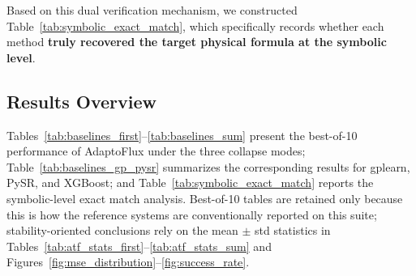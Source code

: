 Based on this dual verification mechanism, we constructed Table~\ref{tab:symbolic_exact_match}, which specifically records whether each method \textbf{truly recovered the target physical formula at the symbolic level}.

\subsection{Results Overview}

Tables~\ref{tab:baselines_first}--\ref{tab:baselines_sum} present the best-of-10 performance of AdaptoFlux under the three collapse modes; Table~\ref{tab:baselines_gp_pysr} summarizes the corresponding results for gplearn, PySR, and XGBoost; and Table~\ref{tab:symbolic_exact_match} reports the symbolic-level exact match analysis. Best-of-10 tables are retained only because this is how the reference systems are conventionally reported on this suite; stability-oriented conclusions rely on the mean $\pm$ std statistics in Tables~\ref{tab:atf_stats_first}--\ref{tab:atf_stats_sum} and Figures~\ref{fig:mse_distribution}--\ref{fig:success_rate}.

